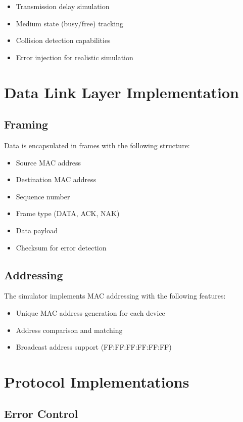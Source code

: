 \documentclass[12pt,a4paper]{article}
\begin{document}
\begin{itemize}
    \item Transmission delay simulation
    \item Medium state (busy/free) tracking
    \item Collision detection capabilities
    \item Error injection for realistic simulation
\end{itemize}

\section{Data Link Layer Implementation}
\subsection{Framing}
Data is encapsulated in frames with the following structure:
\begin{itemize}
    \item Source MAC address
    \item Destination MAC address
    \item Sequence number
    \item Frame type (DATA, ACK, NAK)
    \item Data payload
    \item Checksum for error detection
\end{itemize}

\subsection{Addressing}
The simulator implements MAC addressing with the following features:
\begin{itemize}
    \item Unique MAC address generation for each device
    \item Address comparison and matching
    \item Broadcast address support (FF:FF:FF:FF:FF:FF)
\end{itemize}

\section{Protocol Implementations}
\subsection{Error Control}
\end{document}
